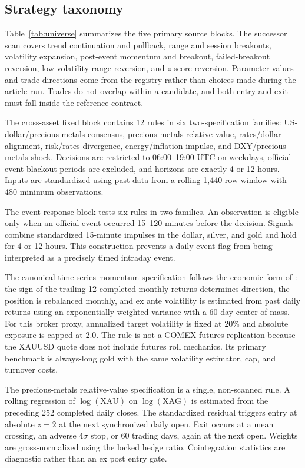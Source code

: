 \subsection{Strategy taxonomy}\label{subsec:taxonomy}

Table~\ref{tab:universe} summarizes the five primary source blocks. The successor scan covers trend continuation and pullback, range and session breakouts, volatility expansion, post-event momentum and breakout, failed-breakout reversion, low-volatility range reversion, and $z$-score reversion. Parameter values and trade directions come from the registry rather than choices made during the article run. Trades do not overlap within a candidate, and both entry and exit must fall inside the reference contract.

The cross-asset fixed block contains 12 rules in six two-specification families: US-dollar/precious-metals consensus, precious-metals relative value, rates/dollar alignment, risk/rates divergence, energy/inflation impulse, and DXY/precious-metals shock. Decisions are restricted to 06:00--19:00 UTC on weekdays, official-event blackout periods are excluded, and horizons are exactly 4 or 12 hours. Inputs are standardized using past data from a rolling 1,440-row window with 480 minimum observations.

The event-response block tests six rules in two families. An observation is eligible only when an official event occurred 15--120 minutes before the decision. Signals combine standardized 15-minute impulses in the dollar, silver, and gold and hold for 4 or 12 hours. This construction prevents a daily event flag from being interpreted as a precisely timed intraday event.

The canonical time-series momentum specification follows the economic form of \citet{moskowitz2012}: the sign of the trailing 12 completed monthly returns determines direction, the position is rebalanced monthly, and ex ante volatility is estimated from past daily returns using an exponentially weighted variance with a 60-day center of mass. For this broker proxy, annualized target volatility is fixed at 20\% and absolute exposure is capped at 2.0. The rule is not a COMEX futures replication because the XAUUSD quote does not include futures roll mechanics. Its primary benchmark is always-long gold with the same volatility estimator, cap, and turnover costs.

The precious-metals relative-value specification is a single, non-scanned rule. A rolling regression of $\log(\mathrm{XAU})$ on $\log(\mathrm{XAG})$ is estimated from the preceding 252 completed daily closes. The standardized residual triggers entry at absolute $z=2$ at the next synchronized daily open. Exit occurs at a mean crossing, an adverse $4\sigma$ stop, or 60 trading days, again at the next open. Weights are gross-normalized using the locked hedge ratio. Cointegration statistics are diagnostic rather than an ex post entry gate.

